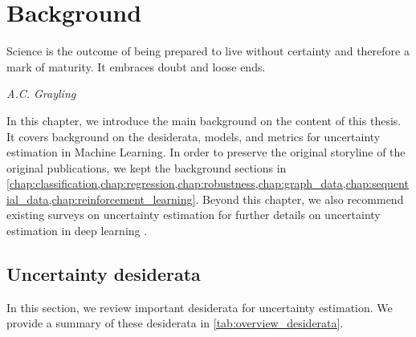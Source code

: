 \chapter{Background}
\label{chap:background}

\epigraph{Science is the outcome of being prepared to live without certainty and therefore a mark of maturity. It embraces doubt and loose ends.}{\textit{A.C. Grayling}}

In this chapter, we introduce the main background on the content of this thesis. It covers background on the desiderata, models, and metrics for uncertainty estimation in Machine Learning. In order to preserve the original storyline of the original publications, we kept the background sections in \cref{chap:classification,chap:regression,chap:robustness,chap:graph_data,chap:sequential_data,chap:reinforcement_learning}. Beyond this chapter, we also recommend existing surveys on uncertainty estimation for further details on uncertainty estimation in deep learning \citep{uncertainty-survey,review-uncertainty-dl,psaros2023uncertainty,conformal-survey,hullermeier2021aleatoric}.

\section{Uncertainty desiderata}
\label{sec:background-desiderata}

In this section, we review important desiderata for uncertainty estimation. We provide a summary of these desiderata in \cref{tab:overview_desiderata}.

